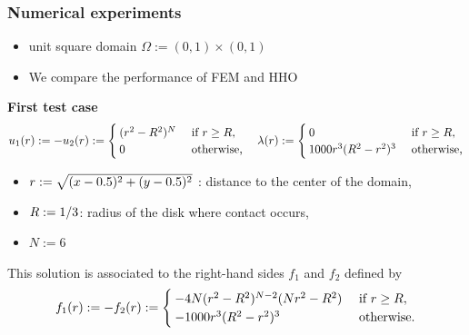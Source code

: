 \begin{frame}
  \frametitle{Numerical experiments}
  \begin{itemize}
  \item unit square domain $\Omega:=(0,1)\times(0,1)$
  \item We compare the performance of FEM and HHO
  \end{itemize}
  \textcolor{cadmiumgreen}{\textbf{First test case}}
\begin{equation*}
  u_1 (r) := - u_2(r) :=
  \begin{cases}
    ( r^2 - R^2 )^N 
    &\text{ if } r \geq R ,
    \\
    0 &\text{ otherwise,}
  \end{cases}
  \quad
 \lambda(r) :=
  \begin{cases}
    0 
    &\text{ if } r \geq R ,
    \\
     1000 r^3 (R^2 - r^2)^3 
    &\text{ otherwise,}
  \end{cases}
  \end{equation*}
\begin{itemize}
\item $r := \sqrt{(x-0.5)^2 + (y-0.5)^2}$ : distance to the center of the domain,
\item $R := 1/3$: radius of the disk where contact occurs,
\item  $N := 6$
  \end{itemize}
This solution is associated to the right-hand sides $f_1$ and $f_2$ defined by
\begin{align*}
  f_1(r) := - f_2(r) :=
  \begin{cases}
    -4N (r^2 - R^2)^{N-2} (N r^2 - R^2)
    &\text{ if } r \geq R ,
    \\
    - 1000 r^3 (R^2 - r^2)^3
    &\text{ otherwise.}
  \end{cases}
\end{align*}
\end{frame}
